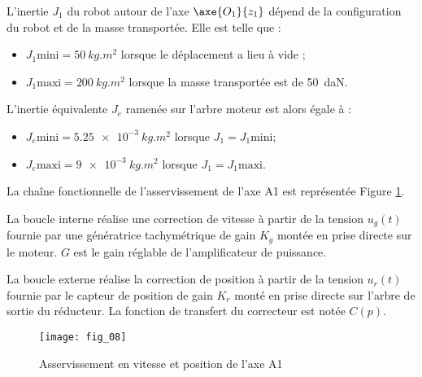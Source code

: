 L’inertie $J_1$ du robot autour de l’axe $\axe{O_1}{z_1}$ dépend de la configuration du robot et de la masse
transportée. Elle est telle que : 
\begin{itemize}
\item $J_1 \text{mini} = \SI{50}{kg.m^2}$  lorsque le déplacement a lieu à vide ; 
\item $J_1 \text{maxi} = \SI{200}{kg.m^2}$  lorsque la masse transportée est de \SI{50}{daN}. 
\end{itemize}
L’inertie équivalente $J_e$ ramenée sur l’arbre moteur est alors égale à : 
\begin{itemize}
\item $J_e \text{mini} = \SI{5,25e-3}{kg.m^2}$  lorsque $J_1 = J_1 \text{mini}$; 
\item $J_e \text{maxi} = \SI{9e-3}{kg.m^2}$  lorsque $J_1 = J_1 \text{maxi}$. 
\end{itemize}

La chaîne fonctionnelle de l’asservissement de l’axe A1 est représentée Figure \ref{kuka:fig:08}. 

La boucle interne réalise une correction de vitesse à partir de la tension $u_g(t)$ fournie par une 
génératrice tachymétrique de gain $K_g$ montée en prise directe sur le moteur. $G$ est le gain 
réglable de l’amplificateur de puissance. 


La boucle externe réalise la correction de position à partir de la tension $u_r(t)$ fournie par le 
capteur de position de gain $K_r$ monté en prise directe sur l’arbre de sortie du réducteur. La 
fonction de transfert du correcteur est notée $C(p)$.


\begin{figure}[!h]
\centering
\texttt{[image: fig\_08]}
\caption{Asservissement en vitesse et position de l’axe A1\label{kuka:fig:08}}
\end{figure}